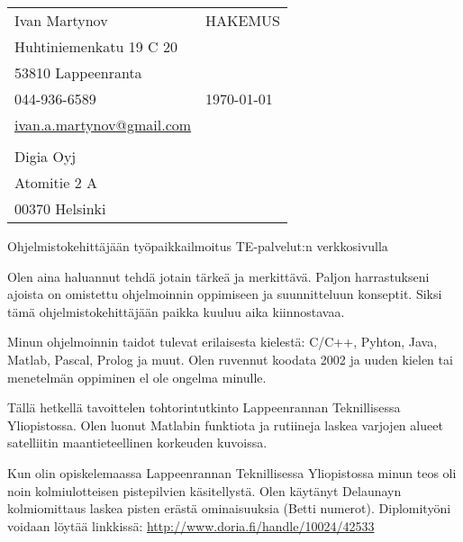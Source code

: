 \documentclass[]{article}
\begin{document}
\begin{table}[h]
  \begin{tabular}{p{} p{}}
    Ivan Martynov & HAKEMUS\\
    Huhtiniemenkatu 19 C 20 & \\
    53810 Lappeenranta & \\
    044-936-6589 & \today\\
    \href{ivan.a.martynov@gmail.com}{ivan.a.martynov@gmail.com} &\\
    &\\
    Digia Oyj & \\
    Atomitie 2 A & \\
    00370 Helsinki & \\
  \end{tabular}
\end{table}

\begin{center}
  Ohjelmistokehitt\"aj\"a\"an ty\"opaikkailmoitus TE-palvelut:n verkkosivulla
\end{center}

\noindent
Olen aina haluannut tehd\"a jotain t\"arke\"a ja merkitt\"av\"a. Paljon
harrastukseni ajoista on omistettu ohjelmoinnin oppimiseen ja suunnitteluun
konseptit. Siksi t\"am\"a ohjelmistokehitt\"aj\"a\"an paikka kuuluu aika
kiinnostavaa.
\medskip

\noindent
Minun ohjelmoinnin taidot tulevat erilaisesta kielest\"a: C/C++, Pyhton,
Java, Matlab, Pascal, Prolog ja muut. Olen ruvennut koodata 2002 ja uuden
kielen tai menetelm\"an oppiminen el ole ongelma minulle.
\medskip

\noindent
T\"all\"a hetkell\"a tavoittelen tohtorintutkinto Lappeenrannan Teknillisessa
Yliopistossa. Olen luonut Matlabin funktiota ja rutiineja laskea varjojen alueet
satelliitin maantieteellinen korkeuden kuvoissa.
\medskip

\noindent
Kun olin opiskelemaassa Lappeenrannan Teknillisessa Yliopistossa minun teos oli
noin kolmiulotteisen pistepilvien k\"asitellyst\"a. Olen k\"ayt\"anyt Delaunayn
kolmiomittaus laskea pisten er\"ast\"a ominaisuuksia (Betti numerot).
Diplomity\"oni voidaan l\"oyt\"a\"a linkkiss\"a:
\href{http://www.doria.fi/handle/10024/42533}
{http://www.doria.fi/handle/10024/42533}
\medskip
\end{document}
